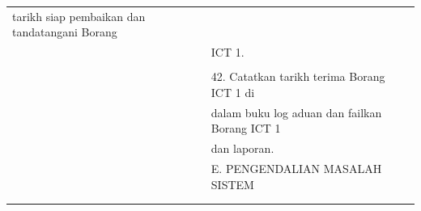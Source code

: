 \documentclass[
]{article}
\begin{document}
\begin{longtable}[]{@{}ll@{}}
\begin{minipage}[t]{0.71\columnwidth}
tarikh siap pembaikan dan tandatangani Borang\strut
\end{minipage}\tabularnewline
\begin{minipage}[t]{0.23\columnwidth}\raggedright
\strut
\end{minipage} & \begin{minipage}[t]{0.71\columnwidth}\raggedright
ICT 1.\strut
\end{minipage}\tabularnewline
\begin{minipage}[t]{0.23\columnwidth}\raggedright
\strut
\end{minipage} & \begin{minipage}[t]{0.71\columnwidth}\raggedright
\strut
\end{minipage}\tabularnewline
\begin{minipage}[t]{0.23\columnwidth}\raggedright
\strut
\end{minipage} & \begin{minipage}[t]{0.71\columnwidth}\raggedright
42. Catatkan tarikh terima Borang ICT 1 di\strut
\end{minipage}\tabularnewline
\begin{minipage}[t]{0.23\columnwidth}\raggedright
\strut
\end{minipage} & \begin{minipage}[t]{0.71\columnwidth}\raggedright
dalam buku log aduan dan failkan Borang ICT 1\strut
\end{minipage}\tabularnewline
\begin{minipage}[t]{0.23\columnwidth}\raggedright
\strut
\end{minipage} & \begin{minipage}[t]{0.71\columnwidth}\raggedright
dan laporan.\strut
\end{minipage}\tabularnewline
\begin{minipage}[t]{0.23\columnwidth}\raggedright
\strut
\end{minipage} & \begin{minipage}[t]{0.71\columnwidth}\raggedright
E. PENGENDALIAN MASALAH SISTEM\strut
\end{minipage}\tabularnewline
\begin{minipage}[t]{0.23\columnwidth}\raggedright
\strut
\end{minipage} & \begin{minipage}[t]{0.71\columnwidth}\raggedright
\strut
\end{minipage}\tabularnewline
\begin{minipage}[t]{0.23\columnwidth}\raggedright
\strut

\end{minipage}
\end{longtable}
\end{document}
